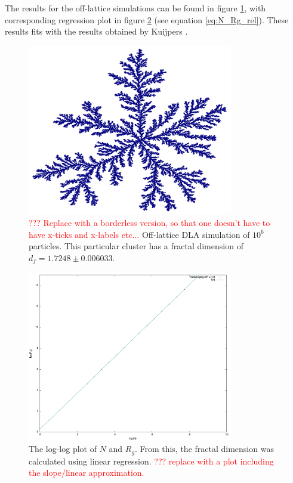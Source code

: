 The results for the off-lattice simulations can be found in figure \ref{fig:2d-DLA_1mill}, with corresponding regression plot in figure \ref{fig:loglog2d-DLA_1mill} (see equation \eqref{eq:N_Rg_rel}). These results fits with the results obtained by Kuijpers \cite{Kuijpers2014841}.
\begin{figure}
	\begin{center}
		\includegraphics[width = 0.8\textwidth]{fig/1_(1_7248).png}
		\caption{\textcolor{red}{??? Replace with a borderless version, so that one doesn't have to have x-ticks and x-labels etc...} Off-lattice DLA simulation of $10^6$ particles. This particular cluster has a fractal dimension of $d_f = 1.7248 \pm 0.006033$.}
		\label{fig:2d-DLA_1mill}
	\end{center}
\end{figure}

\begin{figure}
	\begin{center}
		\includegraphics[width = 0.8\textwidth]{fig/loglog(1_7248).png}
		\caption{The log-log plot of $N$ and $R_g$. From this, the fractal dimension was calculated using linear regression.  \textcolor{red}{??? replace with a plot including the slope/linear approximation.}}
		\label{fig:loglog2d-DLA_1mill}
	\end{center}
\end{figure}




